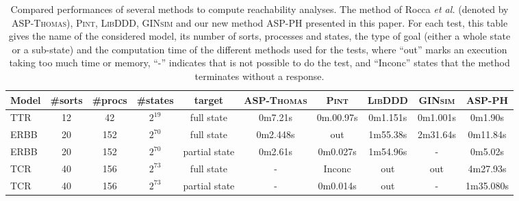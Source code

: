 \begin{table}[htp]
\begin{center}
\noindent%
\begin{tabular}{|l|c|c|c|c||c|c|c|c|c|}
  \hline
   Model&  \#sorts &\#procs & \#states & target & \textsc{ASP-Thomas} & \textsc{Pint} & \textsc{LibDDD} & \textsc{GINsim} & \textsc{ASP-PH} \\
  \hline
  TTR & 12 &42 & $2^{19}$ & full state & 0m7.21s & 0m.00.97s & 0m1.151s &  0m1.001s & 0m1.90s \\
  \hline
  ERBB & 20 &152 & $2^{70}$ & full state & 0m2.448s & out &1m55.38s & 2m31.64s & 0m11.84s \\
  \hline
  ERBB & 20 &152 & $2^{70}$ & partial state & 0m2.61s & 0m0.027s &1m54.96s & - & 0m5.02s \\
  \hline
  TCR & 40 &156 & $2^{73}$ & full state & - & Inconc & out & out & 4m27.93s \\
  \hline
   TCR & 40 &156 & $2^{73}$ & partial state & - & 0m0.014s & out & - & 1m35.080s \\
  \hline
\end{tabular}
\caption{\label{tab:reachability}%
Compared performances of several methods to compute reachability analyses.
The method of Rocca \textit{et al.} (denoted by \textsc{ASP-Thomas}), \textsc{Pint}, \textsc{LibDDD}, \textsc{GINsim} and our new method \textsc{ASP-PH} presented in this paper.
For each test, this table gives the name of the considered model,
its number of sorts, processes and states, the type of goal
(either a whole state or a sub-state)
and the computation time of the different methods used for the tests,
where “out” marks an execution taking too much time or memory,
“-” indicates that is not possible to do the test,
and “Inconc” states that the method terminates without a response.
}
\end{center}
\end{table}

